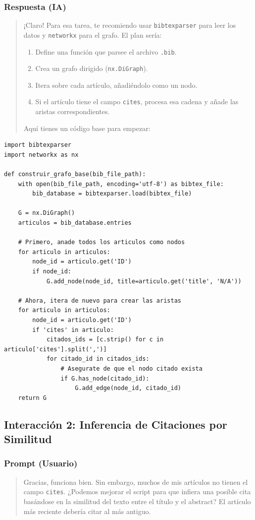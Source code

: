 \documentclass[12pt]{article}
\begin{document}
\subsubsection*{Respuesta (IA)}
\begin{quote}
¡Claro! Para esa tarea, te recomiendo usar \texttt{bibtexparser} para leer los datos y \texttt{networkx} para el grafo. El plan sería:
\begin{enumerate}
    \item Define una función que parsee el archivo \texttt{.bib}.
    \item Crea un grafo dirigido (\texttt{nx.DiGraph}).
    \item Itera sobre cada artículo, añadiéndolo como un nodo.
    \item Si el artículo tiene el campo \texttt{cites}, procesa esa cadena y añade las aristas correspondientes.
\end{enumerate}
Aquí tienes un código base para empezar:
\end{quote}
\begin{lstlisting}
import bibtexparser
import networkx as nx

def construir_grafo_base(bib_file_path):
    with open(bib_file_path, encoding='utf-8') as bibtex_file:
        bib_database = bibtexparser.load(bibtex_file)
    
    G = nx.DiGraph()
    articulos = bib_database.entries
    
    # Primero, anade todos los articulos como nodos
    for articulo in articulos:
        node_id = articulo.get('ID')
        if node_id:
            G.add_node(node_id, title=articulo.get('title', 'N/A'))
    
    # Ahora, itera de nuevo para crear las aristas
    for articulo in articulos:
        node_id = articulo.get('ID')
        if 'cites' in articulo:
            citados_ids = [c.strip() for c in articulo['cites'].split(',')]
            for citado_id in citados_ids:
                # Asegurate de que el nodo citado exista
                if G.has_node(citado_id):
                    G.add_edge(node_id, citado_id)
    return G
\end{lstlisting}

\subsection{Interacción 2: Inferencia de Citaciones por Similitud}

\subsubsection*{Prompt (Usuario)}
\begin{quote}
Gracias, funciona bien. Sin embargo, muchos de mis artículos no tienen el campo \texttt{cites}. ¿Podemos mejorar el script para que infiera una posible cita basándose en la similitud del texto entre el título y el abstract? El artículo más reciente debería citar al más antiguo.
\end{quote}
\end{document}
